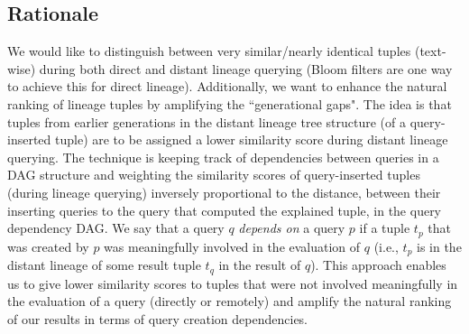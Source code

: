 \subsection{Rationale} We would like to distinguish between very similar/nearly identical tuples (text-wise) during both direct and distant lineage querying (Bloom filters are one way to achieve this for direct lineage). 
Additionally, we want to enhance the natural ranking of lineage tuples by amplifying the ``generational gaps". The idea is that tuples from earlier generations in the distant lineage tree structure (of a query-inserted tuple) are to be assigned a lower similarity score during distant lineage querying. 
The technique is keeping track of dependencies between queries in a DAG structure and weighting the similarity scores of query-inserted tuples (during lineage querying) inversely proportional to the distance, between their inserting queries to the query that computed the explained tuple, in the query dependency DAG. We say that a query $q$ \textit{depends on} a query $p$ if a tuple $t_p$ that was created by $p$ was meaningfully involved in the evaluation of $q$ (i.e., $t_p$ is in the distant lineage of some result tuple $t_q$ in the result of $q$).
This approach enables us to give lower similarity scores to tuples that were not involved meaningfully in the evaluation of a query (directly or remotely) and amplify the natural ranking of our results in terms of query creation dependencies.\\

